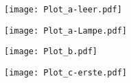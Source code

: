

\pagestyle{empty}



\texttt{[image: Plot\_a-leer.pdf]}

\texttt{[image: Plot\_a-Lampe.pdf]}

\texttt{[image: Plot\_b.pdf]}

\texttt{[image: Plot\_c-erste.pdf]}




